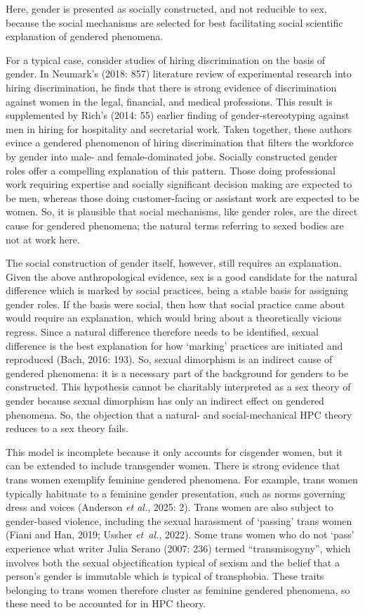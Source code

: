 Here, gender is presented as socially constructed, and not reducible to
sex, because the social mechanisms are selected for best facilitating
social scientific explanation of gendered phenomena.

For a typical case, consider studies of hiring discrimination on the
basis of gender. In Neumark's (2018: 857) literature review of
experimental research into hiring discrimination, he finds that there is
strong evidence of discrimination against women in the legal, financial,
and medical professions. This result is supplemented by Rich's (2014:
55) earlier finding of gender-stereotyping against men in hiring for
hospitality and secretarial work. Taken together, these authors evince a
gendered phenomenon of hiring discrimination that filters the workforce
by gender into male- and female-dominated jobs. Socially constructed
gender roles offer a compelling explanation of this pattern. Those doing
professional work requiring expertise and socially significant decision
making are expected to be men, whereas those doing customer-facing or
assistant work are expected to be women. So, it is plausible that social
mechanisms, like gender roles, are the direct cause for gendered
phenomena; the natural terms referring to sexed bodies are not at work
here.

The social construction of gender itself, however, still requires an
explanation. Given the above anthropological evidence, sex is a good
candidate for the natural difference which is marked by social
practices, being a stable basis for assigning gender roles. If the basis
were social, then how that social practice came about would require an
explanation, which would bring about a theoretically vicious regress.
Since a natural difference therefore needs to be identified, sexual
difference is the best explanation for how `marking' practices are
initiated and reproduced (Bach, 2016: 193). So, sexual dimorphism is an
indirect cause of gendered phenomena: it is a necessary part of the
background for genders to be constructed. This hypothesis cannot be
charitably interpreted as a sex theory of gender because sexual
dimorphism has only an indirect effect on gendered phenomena. So, the
objection that a natural- and social-mechanical HPC theory reduces to a
sex theory fails.

This model is incomplete because it only accounts for cisgender women,
but it can be extended to include transgender women. There is strong
evidence that trans women exemplify feminine gendered phenomena. For
example, trans women typically habituate to a feminine gender
presentation, such as norms governing dress and voices (Anderson
\emph{et al.}, 2025: 2). Trans women are also subject to gender-based
violence, including the sexual harassment of `passing' trans women
(Fiani and Han, 2019; Ussher \emph{et~al.}, 2022). Some trans women who
do not `pass' experience what writer Julia Serano (2007: 236) termed
``transmisogyny'', which involves both the sexual objectification
typical of sexism and the belief that a person's gender is immutable
which is typical of transphobia. These traits belonging to trans women
therefore cluster as feminine gendered phenomena, so these need to be
accounted for in HPC theory.

